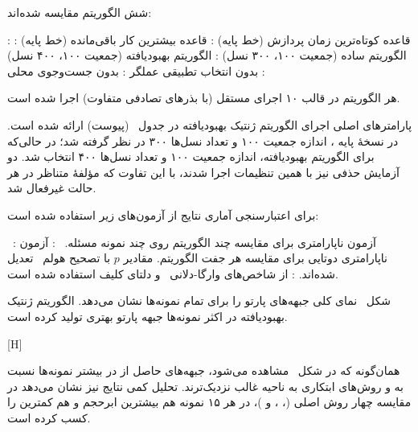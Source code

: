 


شش الگوریتم مقایسه شده‌اند:

 : قاعده کوتاه‌ترین زمان پردازش (خط پایه)
 : قاعده بیشترین کار باقی‌مانده (خط پایه)
 : الگوریتم  ساده (جمعیت ۱۰۰، ۳۰۰ نسل)
 : الگوریتم  بهبودیافته (جمعیت ۱۰۰، ۴۰۰ نسل)
 : بدون انتخاب تطبیقی عملگر
 : بدون جست‌وجوی محلی

هر الگوریتم در قالب ۱۰ اجرای مستقل (با بذرهای تصادفی متفاوت) اجرا شده است.



پارامترهای اصلی اجرای الگوریتم ژنتیک بهبودیافته در جدول~ (پیوست) ارائه شده است.
در نسخهٔ پایه ، اندازه جمعیت ۱۰۰ و تعداد نسل‌ها ۳۰۰ در نظر گرفته شد؛
در حالی‌که برای الگوریتم بهبودیافته، اندازه جمعیت ۱۰۰ و تعداد نسل‌ها ۴۰۰ انتخاب شد.
دو آزمایش حذفی نیز با همین تنظیمات اجرا شدند، با این تفاوت که مؤلفهٔ متناظر در هر حالت غیرفعال شد.


برای اعتبارسنجی آماری نتایج از آزمون‌های زیر استفاده شده است:

 ~\cite{friedman1937use}:
آزمون ناپارامتری برای مقایسه چند الگوریتم روی چند نمونه مسئله.
 ~\cite{wilcoxon1945individual}:
آزمون ناپارامتری دوتایی برای مقایسه هر جفت الگوریتم.
مقادیر $p$ با تصحیح هولم~\cite{holm1979simple} تعدیل شده‌اند.
 :
از شاخص‌های  وارگا-دلانی~\cite{vargha2000critique}
و دلتای کلیف استفاده شده است.




شکل~ نمای کلی جبهه‌های پارتو را برای تمام نمونه‌ها نشان می‌دهد.
الگوریتم ژنتیک بهبودیافته در اکثر نمونه‌ها جبهه پارتو بهتری تولید کرده است.

[H]

همان‌گونه که در شکل~ مشاهده می‌شود، جبهه‌های حاصل از
 در بیشتر نمونه‌ها نسبت به  و روش‌های ابتکاری
به ناحیه غالب نزدیک‌ترند. تحلیل کمی نتایج نیز نشان می‌دهد در مقایسه چهار روش اصلی
(، ،  و )،
 در هر ۱۵ نمونه هم بیشترین ابرحجم و هم کمترین  را کسب کرده است.

